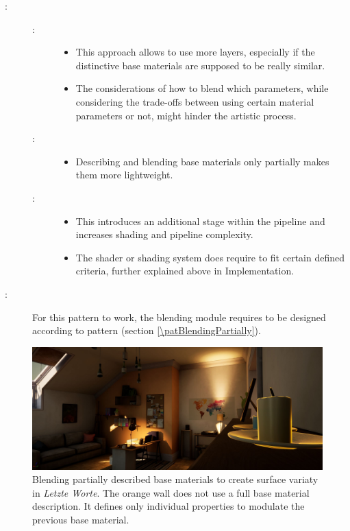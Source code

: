 \begin{description}
	\item[\patConsequences:]\hfill 
		\begin{description}
			\item[\visual:]\hfill
			\begin{itemize}\mynobreakpar
				\item This approach allows to use more layers, especially if the distinctive base materials are supposed to be really similar. 
				\item The considerations of how to blend which parameters, while considering the trade-offs between using certain material parameters or not, might hinder the artistic process. 
			\end{itemize}
			\item[\performance:]\hfill
			\begin{itemize}\mynobreakpar
				\item Describing and blending base materials only partially makes them more lightweight. 
			\end{itemize}
			\item[\pipeline:]\hfill
			\begin{itemize}\mynobreakpar
				\item This introduces an additional stage within the pipeline and increases shading and pipeline complexity. 
				\item The shader or shading system does require to fit certain defined criteria, further explained above in Implementation.
			\end{itemize}
		\end{description}
	\item[\patRelations:]%
	For this pattern to work, the blending module requires to be designed according to pattern \emph{\patBlendingPartially} (section \ref{\patBlendingPartially}).
\end{description}

\begin{figure}
	\centering
	\includegraphics[width=0.9\linewidth]{images/07cha_16_leaRoomWallModulation.jpg}
	\caption{ Blending partially described base materials to create surface variaty in \emph{Letzte Worte}. The orange wall does not use a full base material description. It defines only individual properties to modulate the previous base material.}
	\label{fig:learoomwallmodulation}
\end{figure}


